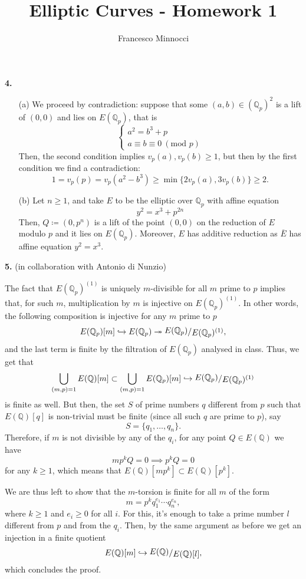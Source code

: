 \documentclass[a4paper]{article}
\title{Elliptic Curves - Homework 1}
\author{Francesco Minnocci}
\newcommand{\Q}{\mathbb{Q}}
\newcommand{\Qp}{\Q_p}
\newcommand{\E}{E(\Qp)^{(1)}}
\newcommand{\ssfrac}[2]{
        \raisebox{+0.3ex}{$#1$}
        /
        \raisebox{-0.3ex}{$#2$}
}
\theoremstyle{definition}
\theoremstyle{definition}
\theoremstyle{remark}
\theoremstyle{definition}
\begin{document}
\maketitle

\textbf{4. }
\begin{itemize}
    \item[(a)] We proceed by contradiction: suppose that some $(a,b)\in(\Qp)^2$ is a lift of $(0,0)$ and lies on $E(\Qp)$, that is
        \[
            \begin{cases}
                a^2=b^3+p \\
                a\equiv b\equiv 0 ~(\text{mod } p)
            \end{cases}
        \]
        Then, the second condition implies $v_p(a),v_p(b)\geq 1$, but then by the first condition
        we find a contradiction:
        \[
            1=v_p(p)=v_p(a^2-b^3)\geq \min\{2v_p(a),3v_p(b)\}   \geq 2.
        \]

    \item[(b)] Let $n\geq 1$, and take $E$ to be the elliptic over $\Qp$ with affine equation
        \[
            y^2=x^3+p^{2n}
        \]
        Then, $Q\coloneqq (0,p^n)$ is a lift of the point $(0,0)$ on the reduction of $E$ modulo $p$ and it lies on $E(\Qp)$. Moreover, $E$ has additive reduction as $\overline{E}$ has affine equation $y^2=x^3$.
\end{itemize}

\textbf{5. }(in collaboration with Antonio di Nunzio)

The fact that $\E$ is uniquely $m$-divisible for all $m$ prime to $p$ implies that, for such $m$, multiplication by $m$ is injective on $\E$.
In other words, the following composition is injective for any $m$ prime to $p$
\[
    E(\Qp)[m] \hookrightarrow E(\Qp) \twoheadrightarrow \ssfrac{E(\Qp)}{\E},
\]
and the last term is finite by the filtration of $E(\Qp)$ analysed in class. Thus, we get that
\[
    \bigcup_{(m,p)=1} E(\Q)[m]\subset \bigcup_{(m,p)=1} E(\Qp)[m] \hookrightarrow \ssfrac{E(\Qp)}{\E}
\]
is finite as well. But then, the set $S$ of prime numbers $q$ different from $p$ such that $E(\Q)[q]$ is non-trivial must be finite (since all such $q$ are prime to $p$), say
\[
    S=\{q_1,\ldots,q_n\}.
\]
Therefore, if $m$ is not divisible by any of the $q_i$, for any point $Q\in E(\Q)$ we have
\[
    m p^k Q = 0 \implies p^k Q = 0
\]
for any $k\geq 1$, which means that $E(\Q)[m p^k]\subset E(\Q)[p^k]$.

We are thus left to show that the $m$-torsion is finite for all $m$ of the form \[m=p^k q_1^{e_1}\cdots q_n^{e_n},\] where $k\geq 1$ and $e_i\geq 0$ for all $i$. For this, it's enough to take a prime number $l$ different from $p$ and from the $q_i$. Then, by the same argument as before we get an injection in a finite quotient
\[
    E(\Q)[m] \hookrightarrow \ssfrac{E(\Q)}{E(\Q)[l]},
\]
which concludes the proof.
\end{document}
